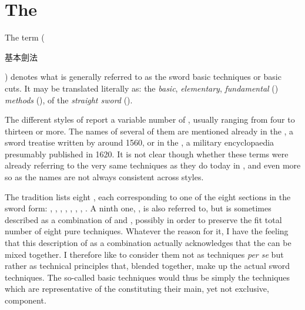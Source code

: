 \chapter{The \Jiben{} \Jianfa{}}\label{ch:jianfa}

The term \Jiben{} \Jianfa{} (\begin{CJK*}{UTF8}{bsmi}基本劍法\end{CJK*}) denotes what is generally referred to as the sword basic techniques or basic cuts.
It may be translated literally as: the \textit{basic}, \textit{elementary}, \textit{fundamental} (\Jiben{}) \textit{methods} (\Fa{}), of the \textit{straight sword} (\Jian{}).

The different styles of \Taijijian{} report a variable number of \Jiben{} \Jianfa{}, usually ranging from four to thirteen or more. The names of several of them are mentioned already in the \JianJing{}, a sword treatise written by \YuDayou{} around 1560, or in the \WubeiZhi{}, a military encyclopaedia presumably published in 1620.
It is not clear though whether these terms were already referring to the very same techniques as they do today in \Taijijian{}, and even more so as the \Jiben{} \Jianfa{} names are not always consistent across styles.

The \Yangjia{} \Michuan{} \Taijijian{} tradition lists eight \Jiben{} \Jianfa{}, each corresponding to one of the eight sections in the \Kunlun{} sword form: \Pi{}, \Ci{}, \Liao{}, \Zha{}, \Mo{}, \Duo{}, \Tiao{}, \Hua{}.
A ninth one, \Dian{}, is also referred to, but is sometimes described as a combination of \Pi{} and \Ci{}, possibly in order to preserve the fit total number of eight pure techniques.
Whatever the reason for it, I have the feeling that this description of \Dian{} as a combination actually acknowledges that the \Jiben{} \Jianfa{} can be mixed together.
I therefore like to consider them not as techniques \textit{per se} but rather as technical principles that, blended together, make up the actual sword techniques. The so-called basic techniques would thus be simply the techniques which are representative  of the \Jiben{} \Jianfa{} constituting their main, yet not exclusive, component. 

